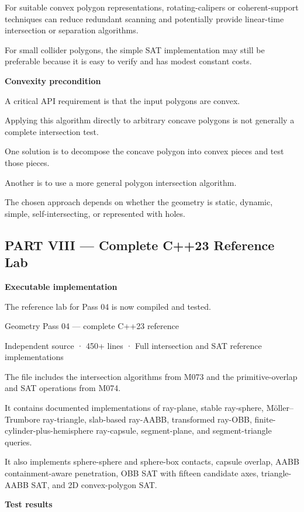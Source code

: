 For suitable convex polygon representations, rotating-calipers or coherent-support techniques can reduce redundant scanning and potentially provide linear-time intersection or separation algorithms.

For small collider polygons, the simple SAT implementation may still be preferable because it is easy to verify and has modest constant costs.

\textbf{Convexity precondition}

A critical API requirement is that the input polygons are convex.

Applying this algorithm directly to arbitrary concave polygons is not generally a complete intersection test.

One solution is to decompose the concave polygon into convex pieces and test those pieces.

Another is to use a more general polygon intersection algorithm.

The chosen approach depends on whether the geometry is static, dynamic, simple, self-intersecting, or represented with holes.

\subsection{PART VIII --- Complete C++23 Reference Lab}\label{04-visual-computing-ii-ch025-part-viii-complete-c23-reference-lab}

\textbf{Executable implementation}

The reference lab for Pass 04 is now compiled and tested.

Geometry Pass 04 --- complete C++23 reference

Independent source · 450+ lines · Full intersection and SAT reference implementations

The file includes the intersection algorithms from M073 and the primitive-overlap and SAT operations from M074.

It contains documented implementations of ray-plane, stable ray-sphere, Möller--Trumbore ray-triangle, slab-based ray-AABB, transformed ray-OBB, finite-cylinder-plus-hemisphere ray-capsule, segment-plane, and segment-triangle queries.

It also implements sphere-sphere and sphere-box contacts, capsule overlap, AABB containment-aware penetration, OBB SAT with fifteen candidate axes, triangle-AABB SAT, and 2D convex-polygon SAT.

\textbf{Test results}

